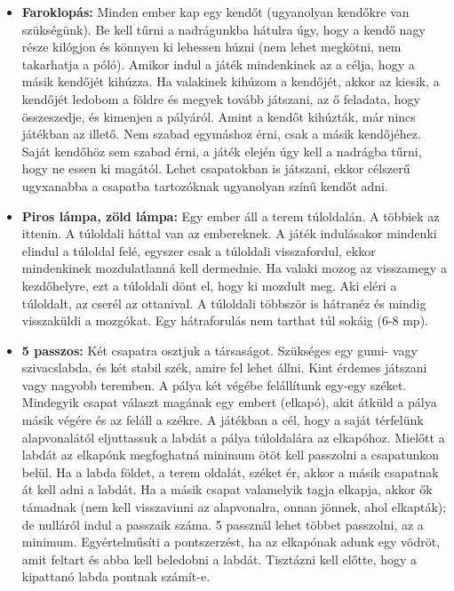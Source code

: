 \documentclass[a4paper, 12pt, twoside, openright]{article}
\begin{document}
\begin{itemize}
\item \textbf{Faroklopás:} Minden ember kap egy kendőt (ugyanolyan kendőkre van szükségünk). Be kell tűrni a nadrágunkba hátulra úgy, hogy a kendő nagy része kilógjon és könnyen ki lehessen húzni (nem lehet megkötni, nem takarhatja a póló). Amikor indul a játék mindenkinek az a célja, hogy a másik kendőjét kihúzza. Ha valakinek kihúzom a kendőjét, akkor az kiesik, a kendőjét ledobom a földre és megyek tovább játszani, az ő feladata, hogy összeszedje, és kimenjen a pályáról. Amint a kendőt kihúzták, már nincs játékban az illető. Nem szabad egymáshoz érni, csak a másik kendőjéhez. Saját kendőhöz sem szabad érni, a játék elején úgy kell a nadrágba tűrni, hogy ne essen ki magától. Lehet csapatokban is játszani, ekkor célszerű ugyxanabba a csapatba tartozóknak ugyanolyan színű kendőt adni.

\item \textbf{Piros lámpa, zöld lámpa:} Egy ember áll a terem túloldalán. A többiek az ittenin. A túloldali háttal van az embereknek. A játék indulásakor mindenki elindul a túloldal felé, egyszer csak a túloldali visszafordul, ekkor mindenkinek mozdulatlanná kell dermednie. Ha valaki mozog az visszamegy a kezdőhelyre, ezt a túloldali dönt el, hogy ki mozdult meg. Aki eléri a túloldalt, az cserél az ottanival. A túloldali többször is hátranéz és mindig visszaküldi a mozgókat. Egy hátraforulás nem tarthat túl sokáig (6-8 mp).

\item \textbf{5 passzos:} Két csapatra osztjuk a társaságot. Szükséges egy gumi- vagy szivacslabda, és két stabil szék, amire fel lehet állni. Kint érdemes játszani vagy nagyobb teremben. A pálya két végébe felállítunk egy-egy széket. Mindegyik csapat választ magának egy embert (elkapó), akit átküld a pálya másik végére és az feláll a székre. A játékban a cél, hogy a saját térfelünk alapvonalától eljuttassuk a labdát a pálya túloldalára az elkapóhoz. Mielőtt a labdát az elkapónk megfoghatná minimum ötöt kell passzolni a csapatunkon belül. Ha a labda földet, a terem oldalát, széket ér, akkor a másik csapatnak át kell adni a labdát. Ha a másik csapat valamelyik tagja elkapja, akkor ők támadnak (nem kell visszavinni az alapvonalra, onnan jönnek, ahol elkapták); de nulláról indul a passzaik száma. 5 passznál lehet többet passzolni, az a minimum. Egyértelműsíti a pontszerzést, ha az elkapónak adunk egy vödröt, amit feltart és abba kell beledobni a labdát. Tisztázni kell előtte, hogy a kipattanó labda pontnak számít-e.


\end{itemize}
\end{document}

